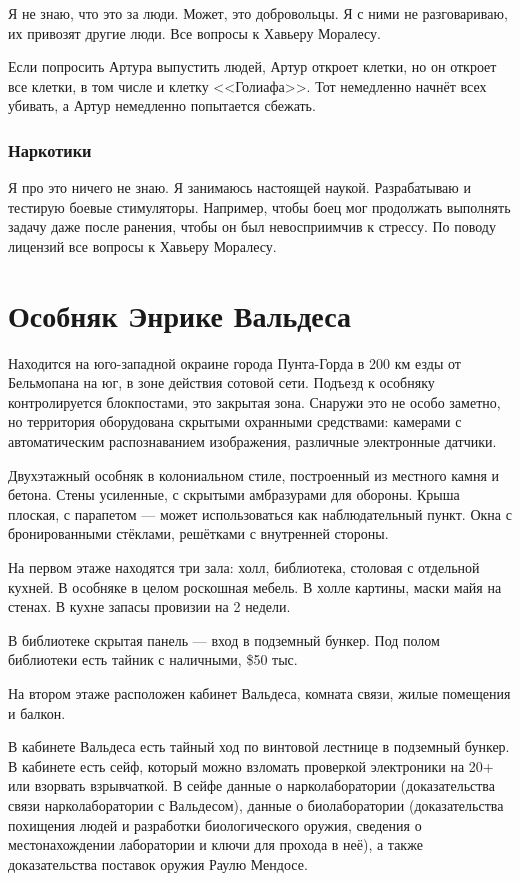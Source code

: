 \documentclass{article}
\begin{document}
Я не знаю, что это за люди. Может, это добровольцы. Я с ними не
разговариваю, их привозят другие люди. Все вопросы к Хавьеру Моралесу.

Если попросить Артура выпустить людей, Артур откроет клетки, но он
откроет все клетки, в том числе и клетку <<Голиафа>>. Тот немедленно
начнёт всех убивать, а Артур немедленно попытается сбежать.

\subsubsection{Наркотики}\label{narcotics-kron}

Я про это ничего не знаю. Я занимаюсь настоящей наукой. Разрабатываю и
тестирую боевые стимуляторы. Например, чтобы боец мог продолжать
выполнять задачу даже после ранения, чтобы он был невосприимчив к
стрессу. По поводу лицензий все вопросы к Хавьеру Моралесу.

\section{Особняк Энрике
Вальдеса}\label{enrique-valdes-mansion}

Находится на юго-западной окраине города Пунта-Горда в 200 км езды от
Бельмопана на юг, в зоне действия сотовой сети. Подъезд к особняку
контролируется блокпостами, это закрытая зона. Снаружи это не особо
заметно, но территория оборудована скрытыми охранными средствами:
камерами с автоматическим распознаванием изображения, различные
электронные датчики.

Двухэтажный особняк в колониальном стиле, построенный из местного камня
и бетона. Стены усиленные, с скрытыми амбразурами для обороны. Крыша
плоская, с парапетом --- может использоваться как наблюдательный пункт.
Окна с бронированными стёклами, решётками с внутренней стороны.

На первом этаже находятся три зала: холл, библиотека, столовая с
отдельной кухней. В особняке в целом роскошная мебель. В холле картины,
маски майя на стенах. В кухне запасы провизии на 2 недели.

В библиотеке скрытая панель --- вход в подземный бункер. Под полом
библиотеки есть тайник с наличными, \$50 тыс.

На втором этаже расположен кабинет Вальдеса, комната связи, жилые
помещения и балкон.

В кабинете Вальдеса есть тайный ход по винтовой лестнице в подземный
бункер. В кабинете есть сейф, который можно взломать проверкой
электроники на 20+ или взорвать взрывчаткой. В сейфе данные о
нарколаборатории (доказательства связи нарколаборатории с Вальдесом),
данные о биолаборатории (доказательства похищения людей и разработки
биологического оружия, сведения о местонахождении лаборатории и ключи
для прохода в неё), а также доказательства поставок оружия Раулю
Мендосе.
\end{document}
